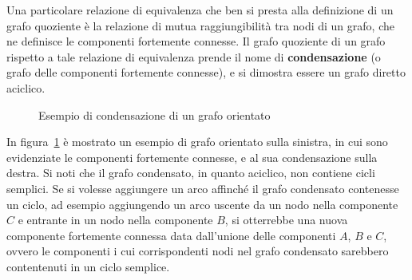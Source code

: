 Una particolare relazione di equivalenza che ben si presta alla definizione di un grafo quoziente \`e la relazione di
mutua raggiungibilit\`a tra nodi di un grafo, che ne definisce le componenti fortemente connesse.
Il grafo quoziente di un grafo rispetto a tale relazione di equivalenza prende il nome di
\textbf{condensazione} (o grafo delle componenti fortemente connesse), e si dimostra essere un grafo diretto aciclico.

\begin{figure}[h]
    \centering
    
    \caption{Esempio di condensazione di un grafo orientato}
    \label{fig:condensation-example}
\end{figure}

In figura~\ref{fig:condensation-example} \`e mostrato un esempio di grafo orientato sulla sinistra, in cui
sono evidenziate le componenti fortemente connesse, e al sua condensazione sulla destra.
Si noti che il grafo condensato, in quanto aciclico, non contiene cicli semplici.
Se si volesse aggiungere un arco affinché il grafo condensato contenesse un ciclo, ad esempio aggiungendo un arco
uscente da un nodo nella componente $C$ e entrante in un nodo nella componente $B$, si otterrebbe una nuova componente
fortemente connessa data dall'unione delle componenti $A$, $B$ e $C$, ovvero le componenti i cui corrispondenti nodi
nel grafo condensato sarebbero contentenuti in un ciclo semplice.